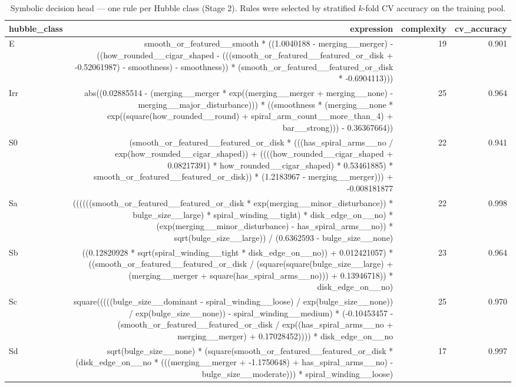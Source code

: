 \begin{table}[t]
\centering
\small
\begin{tabular}{lrrr}
\toprule
hubble\_class & expression & complexity & cv\_accuracy \\
\midrule
E & smooth\_or\_featured\_\_smooth * ((1.0040188 - merging\_\_merger) - ((how\_rounded\_\_cigar\_shaped - (((smooth\_or\_featured\_\_featured\_or\_disk + -0.52061987) - smoothness) - smoothness)) * (smooth\_or\_featured\_\_featured\_or\_disk * -0.6904113))) & 19 & 0.901 \\
Irr & abs((0.02885514 - (merging\_\_merger * exp((merging\_\_merger + merging\_\_none) - merging\_\_major\_disturbance))) * ((smoothness * (merging\_\_none * exp((square(how\_rounded\_\_round) + spiral\_arm\_count\_\_more\_than\_4) + bar\_\_strong))) - 0.36367664)) & 25 & 0.964 \\
S0 & (smooth\_or\_featured\_\_featured\_or\_disk * (((has\_spiral\_arms\_\_no / exp(how\_rounded\_\_cigar\_shaped)) + ((((how\_rounded\_\_cigar\_shaped + 0.08217391) * how\_rounded\_\_cigar\_shaped) * 0.53461885) * smooth\_or\_featured\_\_featured\_or\_disk)) * (1.2183967 - merging\_\_merger))) + -0.008181877 & 22 & 0.941 \\
Sa & ((((((smooth\_or\_featured\_\_featured\_or\_disk * exp(merging\_\_minor\_disturbance)) * bulge\_size\_\_large) * spiral\_winding\_\_tight) * disk\_edge\_on\_\_no) * (exp(merging\_\_minor\_disturbance) - has\_spiral\_arms\_\_no)) * sqrt(bulge\_size\_\_large)) / (0.6362593 - bulge\_size\_\_none) & 22 & 0.998 \\
Sb & ((0.12820928 * sqrt(spiral\_winding\_\_tight * disk\_edge\_on\_\_no)) + 0.012421057) * ((smooth\_or\_featured\_\_featured\_or\_disk / (square(square(bulge\_size\_\_large) + (merging\_\_merger + square(has\_spiral\_arms\_\_no))) + 0.13946718)) * disk\_edge\_on\_\_no) & 23 & 0.964 \\
Sc & square(((((bulge\_size\_\_dominant - spiral\_winding\_\_loose) / exp(bulge\_size\_\_none)) / exp(bulge\_size\_\_none)) - spiral\_winding\_\_medium) * (-0.10453457 - (smooth\_or\_featured\_\_featured\_or\_disk / exp((has\_spiral\_arms\_\_no + merging\_\_merger) + 0.17028452)))) * disk\_edge\_on\_\_no & 25 & 0.970 \\
Sd & sqrt(bulge\_size\_\_none) * (square(smooth\_or\_featured\_\_featured\_or\_disk * (disk\_edge\_on\_\_no * (((merging\_\_merger + -1.1750648) + has\_spiral\_arms\_\_no) - bulge\_size\_\_moderate))) * spiral\_winding\_\_loose) & 17 & 0.997 \\
\bottomrule
\end{tabular}
\caption{Symbolic decision head — one rule per Hubble class (Stage 2). Rules were selected by stratified $k$-fold CV accuracy on the training pool.}
\label{tab:rules}
\end{table}
